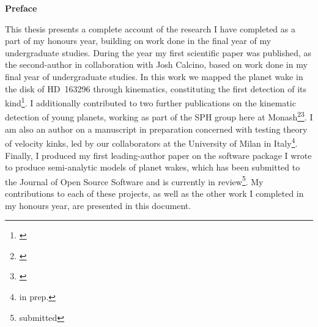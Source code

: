 {}

\begin{center}
    
    {\Large \textbf{Preface}}
    
\end{center}

\noindent This thesis presents a complete account of the research I have completed as a part of my honours year, building on work done in the final year of my undergraduate studies.
During the year my first scientific paper was published, as the second-author in collaboration with Josh Calcino, based on work done in my final year of undergraduate studies.
In this work we mapped the planet wake in the disk of HD~163296 through kinematics, constituting the first detection of its kind\footnote{\citealt{calcino2022}}. 
I additionally contributed to two further publications on the kinematic detection of young planets, working as part of the SPH group here at Monash\footnote{\citealt{verrios2022}}\footnote{\citealt{garg2022}}.
I am also an author on a manuscript in preparation concerned with testing theory of velocity kinks, led by our collaborators at the University of Milan in Italy\footnote{\citeauthor{fasanoinprep.} in prep.}.
Finally, I produced my first leading-author paper on the software package I wrote to produce semi-analytic models of planet wakes, which has been submitted to the Journal of Open Source Software and is currently in review\footnote{\citeauthor{hildersubmitted} submitted}.
My contributions to each of these projects, as well as the other work I completed in my honours year, are presented in this document.


\newpage